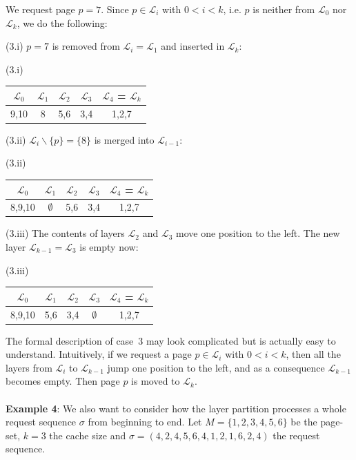 \documentclass[a4paper,12pt, titlepage]{article}  %
\newcommand{\cl}{\mathcal{L}}   %
\begin{document}
We request page $p=7$. Since $p \in \cl_i$ with $0<i<k$, i.e. $p$ is neither from $\cl_0$ nor $\cl_k$, 
we do the following: 

\noindent (3.i) $p=7$ is removed from $\cl_i=\cl_1$ and inserted in $\cl_k$:
\begin{center}
	(3.i)
	\begin{tabular}[ht]{|c|c|c|c|c|}
	  \hline
		$\cl_0$ & $\cl_1$ & $\cl_2$ & $\cl_3$ & $\cl_4$ = $\cl_k$ \\
		\hline		
		9,10 & 8 & 5,6 & 3,4 & 1,2,7 \\
		\hline
	\end{tabular}
\end{center}

\noindent (3.ii) $\cl_i \backslash \{p\}=\{8\}$ is merged into $\cl_{i-1}$:
\begin{center}
	(3.ii)
	\begin{tabular}[ht]{|c|c|c|c|c|}
	  \hline
		$\cl_0$ & $\cl_1$ & $\cl_2$ & $\cl_3$ & $\cl_4$ = $\cl_k$ \\
		\hline		
		8,9,10 & $\emptyset$ & 5,6 & 3,4 & 1,2,7 \\
		\hline
	\end{tabular}
\end{center}

\noindent (3.iii) The contents of layers $\cl_2$ and $\cl_3$ move one position to the left.
The new layer $\cl_{k-1}=\cl_3$ is empty now:
\begin{center}
	(3.iii)
	\begin{tabular}[ht]{|c|c|c|c|c|}
	  \hline
		$\cl_0$ & $\cl_1$ & $\cl_2$ & $\cl_3$ & $\cl_4$ = $\cl_k$ \\
		\hline		
		8,9,10 &  5,6 & 3,4 & $\emptyset$ & 1,2,7 \\
		\hline
	\end{tabular}
\end{center}

\noindent The formal description of case~3 may look complicated but is 
actually easy to understand. Intuitively, if we request a page $p\in \cl_i$ with $0<i<k$, 
then all the layers from $\cl_i$ to $\cl_{k-1}$ jump one position to the left, and as a 
consequence $\cl_{k-1}$ becomes empty. Then page $p$ is moved to $\cl_k$. \\
\\
\noindent \textbf{Example 4}: We also want to consider how the layer partition processes a whole 
request sequence $\sigma$ from beginning to end. Let $M=\{1,2,3,4,5,6\}$ be the page-set, $k=3$ 
the cache size and $\sigma=(4,2,4,5,6,4,1,2,1,6,2,4)$ the request sequence. 
\end{document}
